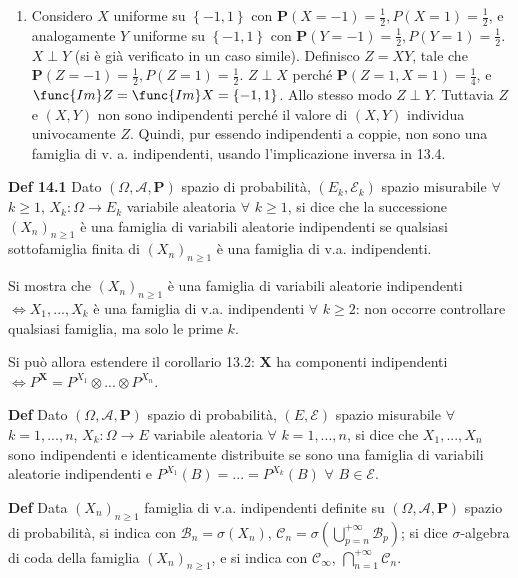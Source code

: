 \documentclass{article}
\begin{document}
\begin{enumerate}
\item Considero $X$ uniforme su $\left\{ -1,1\right\} $ con $\mathbf{P}%
\left( X=-1\right) =\frac{1}{2},P\left( X=1\right) =\frac{1}{2}$, e
analogamente $Y$ uniforme su $\left\{ -1,1\right\} $ con $\mathbf{P}\left(
Y=-1\right) =\frac{1}{2},P\left( Y=1\right) =\frac{1}{2}$. $X\perp Y$ (si 
\`{e} gi\`{a} verificato in un caso simile). Definisco $Z=XY$, tale che $%
\mathbf{P}\left( Z=-1\right) =\frac{1}{2},P\left( Z=1\right) =\frac{1}{2}$. $%
Z\perp X$ perch\'{e} $\mathbf{P}\left( Z=1,X=1\right) =\frac{1}{4}$, e $%
\func{Im}Z=\func{Im}X=\left\{ -1,1\right\} $. Allo stesso modo $Z\perp Y$.
Tuttavia $Z$ e $\left( X,Y\right) $ non sono indipendenti perch\'{e} il
valore di $\left( X,Y\right) $ individua univocamente $Z$. Quindi, pur
essendo indipendenti a coppie, non sono una famiglia di v. a. indipendenti,
usando l'implicazione inversa in 13.4.
\end{enumerate}

\textbf{Def 14.1} Dato $\left( \Omega ,\mathcal{A},\mathbf{P}\right) $
spazio di probabilit\`{a}, $\left( E_{k},\mathcal{E}_{k}\right) $ spazio
misurabile $\forall $ $k\geq 1$, $X_{k}:\Omega \rightarrow E_{k}$ variabile
aleatoria $\forall $ $k\geq 1$, si dice che la successione $\left(
X_{n}\right) _{n\geq 1}$ \`{e} una famiglia di variabili aleatorie
indipendenti se qualsiasi sottofamiglia finita di $\left( X_{n}\right)
_{n\geq 1}$ \`{e} una famiglia di v.a. indipendenti.

Si mostra che $\left( X_{n}\right) _{n\geq 1}$ \`{e} una famiglia di
variabili aleatorie indipendenti $\Longleftrightarrow X_{1},...,X_{k}$ \`{e}
una famiglia di v.a. indipendenti $\forall $ $k\geq 2$: non occorre
controllare qualsiasi famiglia, ma solo le prime $k$.

Si pu\`{o} allora estendere il corollario 13.2: $\mathbf{X}$ ha componenti
indipendenti $\Longleftrightarrow P^{\mathbf{X}}=P^{X_{1}}\otimes ...\otimes
P^{X_{n}}$.

\textbf{Def} Dato $\left( \Omega ,\mathcal{A},\mathbf{P}\right) $ spazio di
probabilit\`{a}, $\left( E,\mathcal{E}\right) $ spazio misurabile $\forall $ 
$k=1,...,n$, $X_{k}:\Omega \rightarrow E$ variabile aleatoria $\forall $ $%
k=1,...,n$, si dice che $X_{1},...,X_{n}$ sono indipendenti e identicamente
distribuite se sono una famiglia di variabili aleatorie indipendenti e $%
P^{X_{1}}\left( B\right) =...=P^{X_{k}}\left( B\right) $ $\forall $ $B\in 
\mathcal{E}$.


\textbf{Def} Data $\left( X_{n}\right) _{n\geq 1}$ famiglia di v.a.
indipendenti definite su $\left( \Omega ,\mathcal{A},\mathbf{P}\right) $
spazio di probabilit\`{a}, si indica con $\mathcal{B}_{n}=\sigma \left(
X_{n}\right) $, $\mathcal{C}_{n}=\sigma \left( \bigcup_{p=n}^{+\infty }%
\mathcal{B}_{p}\right) $; si dice $\sigma $-algebra di coda della famiglia $%
\left( X_{n}\right) _{n\geq 1}$, e si indica con $\mathcal{C}_{\infty }$, $%
\bigcap_{n=1}^{+\infty }\mathcal{C}_{n}$.
\end{document}
